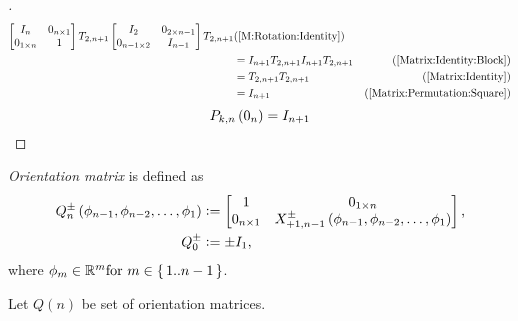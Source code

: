 \documentclass[../main.tex]{subfiles}
\begin{document}
\begin{proof}[]
\begin{align*}
        \begin{bmatrix}
            I_{n}         & 0_{n\times 1} \\
            0_{1\times n} & 1             \\
        \end{bmatrix}
        T_{2, n+1}
        \begin{bmatrix}
            I_{2}              & 0_{{2}\times{n-1}} \\
            0_{{n-1}\times{2}} & {I}_{n-1}          \\
        \end{bmatrix}
        T_{2, n+1} & \text{(\cref{M:Rotation:Identity})}                     \\
                   & =
        I_{n+1}
        T_{2, n+1}
        I_{n+1}
        T_{2, n+1} & \text{(\cref{Matrix:Identity:Block})}                   \\
                   & =
        T_{2, n+1}
        T_{2, n+1} & \text{(\cref{Matrix:Identity})}                         \\
                   & =
        I_{n+1}    & \text{(\cref{Matrix:Permutation:Square})}
    \end{align*}
    \begin{equation*}
        P_{k,n}
        \left(0_{n}\right)
        =
        I_{n+1}
        \qedhere
    \end{equation*}
\end{proof}
\begin{definition}\label{M:Orientation}
    \textit{Orientation matrix} is defined as
    \begin{align*}
        Q^\pm_n\left(\phi_{n-1},\phi_{n-2},\dots,\phi_1\right) & \vcentcolon=
        \begin{bmatrix}
            1             & 0_{1\times n}                                                 \\
            0_{n\times 1} & X^\pm_{+1,n-1}\left(\phi_{n-1},\phi_{n-2},\dots,\phi_1\right) \\
        \end{bmatrix}\text{,}   \\
        Q^\pm_0                                                & \vcentcolon= \pm I_1\text{,}
    \end{align*}
    where $\phi_m\in\mathbb{R}^m \text{for } m\in\set{1..n-1}$.
\end{definition}
\begin{definition}\label{M:Orientation:Set}
    Let $Q\left(n\right)$ be set of orientation matrices.
\end{definition}
\end{document}
